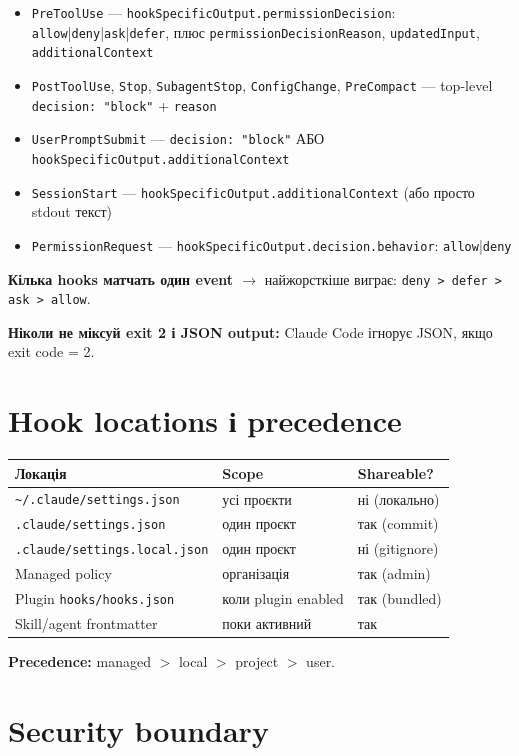 \documentclass[11pt,a4paper]{article}
\begin{document}
\begin{itemize}
\item \texttt{PreToolUse} --- \texttt{hookSpecificOutput.permissionDecision}: \texttt{allow}|\texttt{deny}|\texttt{ask}|\texttt{defer}, плюс \texttt{permissionDecisionReason}, \texttt{updatedInput}, \texttt{additionalContext}
\item \texttt{PostToolUse}, \texttt{Stop}, \texttt{SubagentStop}, \texttt{ConfigChange}, \texttt{PreCompact} --- top-level \texttt{decision: "block"} + \texttt{reason}
\item \texttt{UserPromptSubmit} --- \texttt{decision: "block"} АБО \texttt{hookSpecificOutput.additionalContext}
\item \texttt{SessionStart} --- \texttt{hookSpecificOutput.additionalContext} (або просто stdout текст)
\item \texttt{PermissionRequest} --- \texttt{hookSpecificOutput.decision.behavior}: \texttt{allow}|\texttt{deny}
\end{itemize}

\textbf{Кілька hooks матчать один event $\to$} найжорсткіше виграє: \texttt{deny > defer > ask > allow}.

\textbf{Ніколи не міксуй exit 2 і JSON output:} Claude Code ігнорує JSON, якщо exit code = 2.

\section{Hook locations і precedence}

\begin{tabular}{lll}
\hline
\textbf{Локація} & \textbf{Scope} & \textbf{Shareable?} \\
\hline
\texttt{\textasciitilde/.claude/settings.json} & усі проєкти & ні (локально) \\
\texttt{.claude/settings.json} & один проєкт & так (commit) \\
\texttt{.claude/settings.local.json} & один проєкт & ні (gitignore) \\
Managed policy & організація & так (admin) \\
Plugin \texttt{hooks/hooks.json} & коли plugin enabled & так (bundled) \\
Skill/agent frontmatter & поки активний & так \\
\hline
\end{tabular}

\textbf{Precedence:} managed $>$ local $>$ project $>$ user.

\section{Security boundary}
\end{document}
